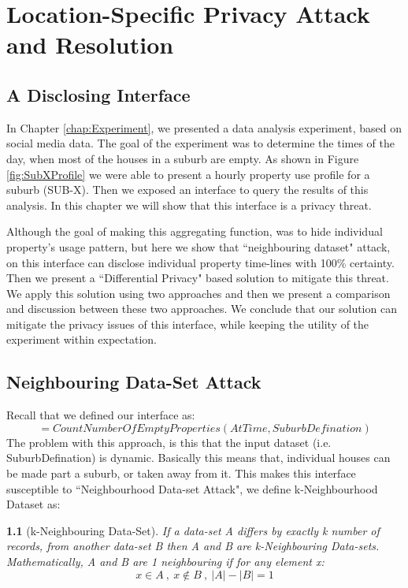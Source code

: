 \documentclass[12pt]{report}
\theoremstyle{named}
\newtheorem*{namedtheorem}{}
\begin{document}
\chapter{Location-Specific Privacy Attack and Resolution }
\label{chap:AttackAndResolution}
\section{A Disclosing Interface}
In Chapter \ref{chap:Experiment}, we presented a data analysis experiment, based on social media data. The goal of the experiment was to determine the times of the day, when most of the houses in a suburb are empty. As shown in Figure \ref{fig:SubXProfile} we were able to present a hourly property use profile for a suburb (SUB-X). Then we exposed an interface to query the results of this analysis. In this chapter we will show that this interface is a privacy threat. 

Although the goal of making this aggregating function, was to hide individual property's usage pattern, but here we show that ``neighbouring dataset" attack, on this interface can disclose individual property time-lines with 100\% certainty. Then we present a ``Differential Privacy" based solution to mitigate this threat. We apply this solution using two approaches and then we present a comparison and discussion between these two approaches. We conclude that our solution can mitigate the privacy issues of this interface, while keeping the utility of the experiment within expectation.
\section{Neighbouring Data-Set Attack}
Recall that we defined our interface as:
\[=CountNumberOfEmptyProperties(AtTime,SuburbDefination)\]
The problem with this approach, is this that the input dataset (i.e. SuburbDefination) is dynamic. Basically this means that, individual houses can be made part a suburb, or taken away from it. This makes this interface susceptible to ``Neighbourhood Data-set Attack", we define k-Neighbourhood Dataset as:

\begin{namedtheorem}[k-Neighbouring Data-Set] If a data-set A differs by exactly k number of records, from another data-set B then A and B are k-Neighbouring Data-sets. Mathematically, A and B are 1 neighbouring if for any element x:\\ \begin{equation}  x\in A\ ,\  x\notin B\: ,\ \left | A \right | - \left | B \right | = 1 \end{equation}

\end{namedtheorem}
\end{document}
